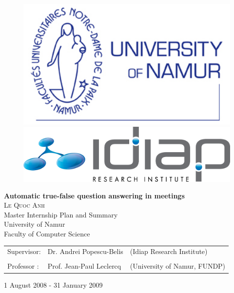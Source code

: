 \documentclass[12pt, a4paper]{report}
\begin{document}
\begin{center}
\thispagestyle{empty}

\begin{figure}[h]
\centering
\begin{minipage}{5cm}
\includegraphics[width=1\textwidth]{logo-fundp.jpg}
\end{minipage}
\hfill
\begin{minipage}{5cm}
\includegraphics[width=1\textwidth]{Idiap-logo-E.png}
\end{minipage}
\end{figure}

\centering
\vfill

\Huge{\textbf{Automatic true-false question answering in meetings}}\\
\vspace{7mm}
\Large{\textsc{Le Quoc Anh}}\\

\vspace{3mm}
Master Internship Plan and Summary \\
\normalsize
\vspace{3mm}
University of Namur \\
Faculty of Computer Science \\
\large

\vfill
\begin{tabular}{l l l}
Supervisor: & Dr. Andrei Popescu-Belis &  (Idiap Research Institute)\\
& & \\
Professor : & Prof. Jean-Paul Leclercq & (University of Namur, FUNDP)\\
\end{tabular}

\vfill
\normalsize
1 August 2008 -  31 January 2009
\end{center}
\end{document}

